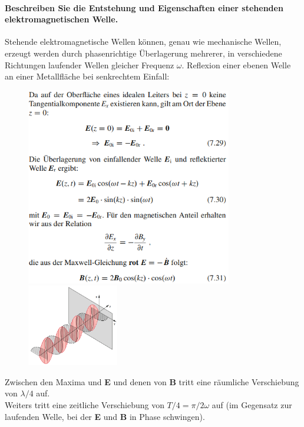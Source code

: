 \documentclass[a4paper, 11pt, parskip=half]{scrartcl}
\begin{document}
\paragraph{Beschreiben Sie die Entstehung und Eigenschaften einer stehenden elektromagnetischen
Welle.} Stehende elektromagnetische Wellen können, genau wie mechanische Wellen, erzeugt werden durch phasenrichtige Überlagerung mehrerer, in verschiedene Richtungen laufender Wellen
gleicher Frequenz $\omega$.
Reflexion einer ebenen Welle an einer Metallfläche bei senkrechtem Einfall:
\begin{figure}[H]
    \centering
    \begin{minipage}[b]{0.3\textwidth}
        \centering
        \includegraphics[width=9cm]{image/13/5.png}
    \end{minipage}
    \hspace{5cm}
    \begin{minipage}[b]{0.3\textwidth}
        \centering
        \includegraphics[width=4cm]{image/13/6.png}
    \end{minipage}
\end{figure}
Zwischen den Maxima und \textbf{E} und denen von \textbf{B} tritt eine räumliche Verschiebung von $\lambda/4$ auf. \\
Weiters tritt eine zeitliche Verschiebung von $T/4 = \pi / 2 \omega$ auf (im Gegensatz zur laufenden Welle, bei der \textbf{E} und \textbf{B} in Phase schwingen).
\end{document}

